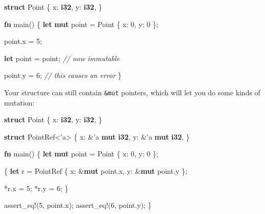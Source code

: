 \documentclass[a4paper,]{book}
\newenvironment{Shaded}{\begin{snugshade}}{\end{snugshade}}
\newcommand{\KeywordTok}[1]{\textcolor[rgb]{0.13,0.29,0.53}{\textbf{{#1}}}}
\newcommand{\DecValTok}[1]{\textcolor[rgb]{0.00,0.00,0.81}{{#1}}}
\newcommand{\CommentTok}[1]{\textcolor[rgb]{0.56,0.35,0.01}{\textit{{#1}}}}
\newcommand{\OtherTok}[1]{\textcolor[rgb]{0.56,0.35,0.01}{{#1}}}
\newcommand{\NormalTok}[1]{{#1}}
\begin{document}
\begin{Shaded}
\begin{Highlighting}[]
\KeywordTok{struct} \NormalTok{Point \{}
    \NormalTok{x: }\KeywordTok{i32}\NormalTok{,}
    \NormalTok{y: }\KeywordTok{i32}\NormalTok{,}
\NormalTok{\}}

\KeywordTok{fn} \NormalTok{main() \{}
    \KeywordTok{let} \KeywordTok{mut} \NormalTok{point = Point \{ x: }\DecValTok{0}\NormalTok{, y: }\DecValTok{0} \NormalTok{\};}

    \NormalTok{point.x = }\DecValTok{5}\NormalTok{;}

    \KeywordTok{let} \NormalTok{point = point; }\CommentTok{// now immutable}

    \NormalTok{point.y = }\DecValTok{6}\NormalTok{; }\CommentTok{// this causes an error}
\NormalTok{\}}
\end{Highlighting}
\end{Shaded}

Your structure can still contain \texttt{\&mut} pointers, which will let
you do some kinds of mutation:

\begin{Shaded}
\begin{Highlighting}[]
\KeywordTok{struct} \NormalTok{Point \{}
    \NormalTok{x: }\KeywordTok{i32}\NormalTok{,}
    \NormalTok{y: }\KeywordTok{i32}\NormalTok{,}
\NormalTok{\}}

\KeywordTok{struct} \NormalTok{PointRef<}\OtherTok{'a}\NormalTok{> \{}
    \NormalTok{x: &}\OtherTok{'a} \KeywordTok{mut} \KeywordTok{i32}\NormalTok{,}
    \NormalTok{y: &}\OtherTok{'a} \KeywordTok{mut} \KeywordTok{i32}\NormalTok{,}
\NormalTok{\}}

\KeywordTok{fn} \NormalTok{main() \{}
    \KeywordTok{let} \KeywordTok{mut} \NormalTok{point = Point \{ x: }\DecValTok{0}\NormalTok{, y: }\DecValTok{0} \NormalTok{\};}

    \NormalTok{\{}
        \KeywordTok{let} \NormalTok{r = PointRef \{ x: &}\KeywordTok{mut} \NormalTok{point.x, y: &}\KeywordTok{mut} \NormalTok{point.y \};}

        \NormalTok{*r.x = }\DecValTok{5}\NormalTok{;}
        \NormalTok{*r.y = }\DecValTok{6}\NormalTok{;}
    \NormalTok{\}}

    \OtherTok{assert_eq!}\NormalTok{(}\DecValTok{5}\NormalTok{, point.x);}
    \OtherTok{assert_eq!}\NormalTok{(}\DecValTok{6}\NormalTok{, point.y);}
\NormalTok{\}}
\end{Highlighting}
\end{Shaded}
\end{document}
